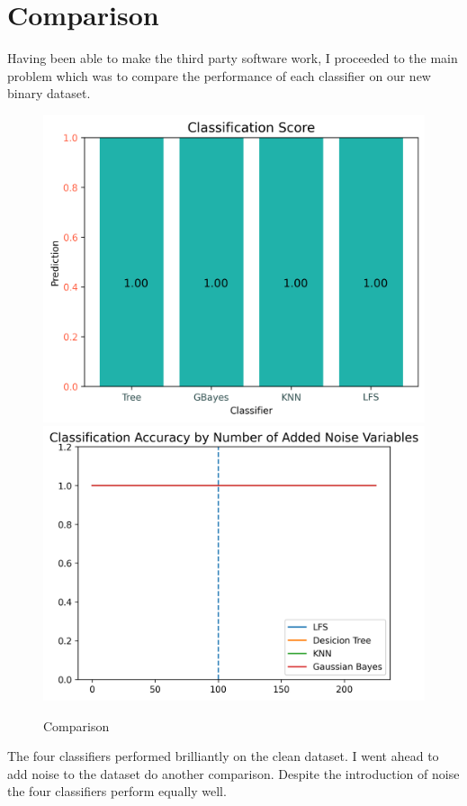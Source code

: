 \documentclass[pdftex,10px,a4paper,oneside]{article}
\begin{document}
\section{Comparison}
Having been able to make the third party software work, I proceeded to the main problem which was to compare the performance of each classifier on our new binary dataset.

\begin{figure}[h]
\includegraphics[scale=0.5]{classification_score}
\includegraphics[scale=0.5]{classification_noise}
\caption{Comparison}
\end{figure}
The four classifiers performed brilliantly on the clean dataset. I went ahead to add noise to the dataset do another comparison.
Despite the introduction of noise the four classifiers perform equally well.
\end{document}
